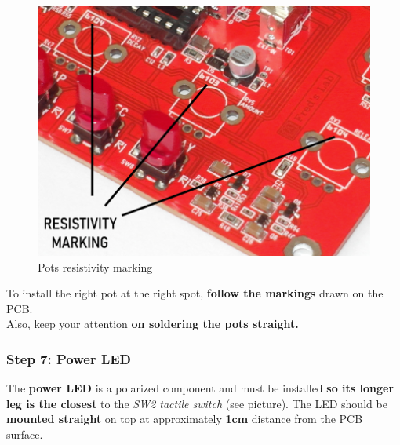 \documentclass{scrartcl}
\begin{document}
\begin{figure}[!ht]
    \begin{center}
        \includegraphics[scale=0.32]{assets/pots-marking.jpg}
        \caption{Pots resistivity marking}
    \end{center}
\end{figure}

To install the right pot at the right spot, \textbf{follow the markings} drawn on the PCB. \\
Also, keep your attention \textbf{on soldering the pots straight.}

\pagebreak

\subsubsection{Step 7: Power LED}

The \textbf{power LED} is a polarized component and must be installed \textbf{so its longer leg is the closest} to the \emph{SW2 tactile switch} (see picture).
The LED should be \textbf{mounted straight} on top at approximately \textbf{1cm} distance from the PCB surface.
\end{document}
